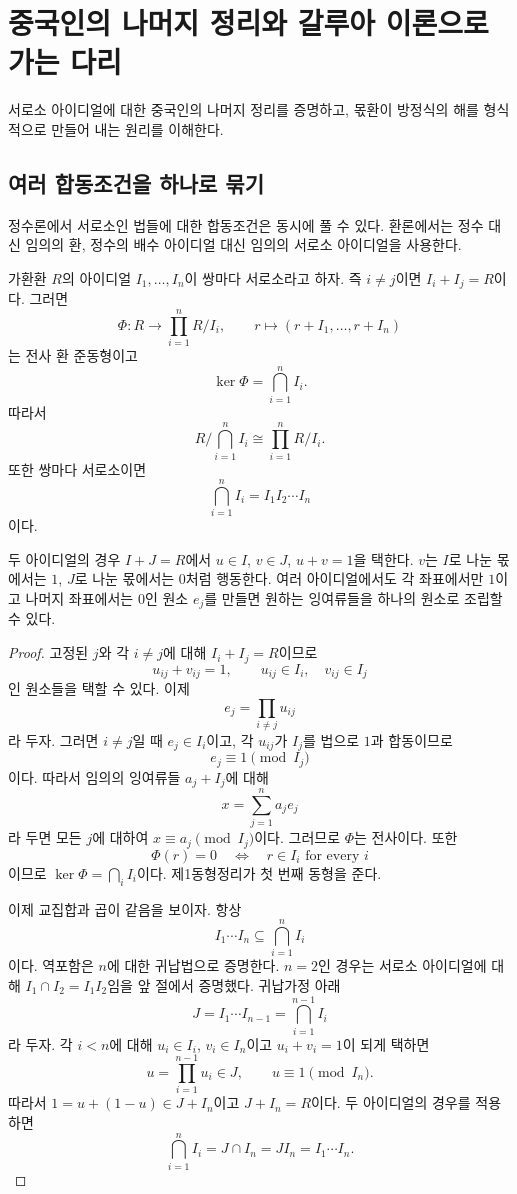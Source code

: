 \section{중국인의 나머지 정리와 갈루아 이론으로 가는 다리}
\label{sec:ring-crt-galois}

\begin{learninggoal}
서로소 아이디얼에 대한 중국인의 나머지 정리를 증명하고, 몫환이 방정식의 해를 형식적으로 만들어 내는 원리를 이해한다.
\end{learninggoal}

\subsection{여러 합동조건을 하나로 묶기}

정수론에서 서로소인 법들에 대한 합동조건은 동시에 풀 수 있다. 환론에서는 정수 대신 임의의 환, 정수의 배수 아이디얼 대신 임의의 서로소 아이디얼을 사용한다.

\begin{theorem}
가환환 $R$의 아이디얼 $I_1,\dots,I_n$이 쌍마다 서로소라고 하자. 즉 $i\ne j$이면 $I_i+I_j=R$이다. 그러면
\[
  \Phi:R\to\prod_{i=1}^nR/I_i,
  \qquad
  r\mapsto(r+I_1,\dots,r+I_n)
\]
는 전사 환 준동형이고
\[
  \ker\Phi=\bigcap_{i=1}^nI_i.
\]
따라서
\[
  R\Big/\bigcap_{i=1}^nI_i
  \cong
  \prod_{i=1}^nR/I_i.
\]
또한 쌍마다 서로소이면
\[
  \bigcap_{i=1}^nI_i=I_1I_2\cdots I_n
\]
이다.
\end{theorem}

\begin{proofidea}
두 아이디얼의 경우 $I+J=R$에서 $u\in I$, $v\in J$, $u+v=1$을 택한다. $v$는 $I$로 나눈 몫에서는 $1$, $J$로 나눈 몫에서는 $0$처럼 행동한다. 여러 아이디얼에서도 각 좌표에서만 $1$이고 나머지 좌표에서는 $0$인 원소 $e_j$를 만들면 원하는 잉여류들을 하나의 원소로 조립할 수 있다.
\end{proofidea}

\begin{proof}
고정된 $j$와 각 $i\ne j$에 대해 $I_i+I_j=R$이므로
\[
  u_{ij}+v_{ij}=1,
  \qquad u_{ij}\in I_i,\quad v_{ij}\in I_j
\]
인 원소들을 택할 수 있다. 이제
\[
  e_j=\prod_{i\ne j}u_{ij}
\]
라 두자. 그러면 $i\ne j$일 때 $e_j\in I_i$이고, 각 $u_{ij}$가 $I_j$를 법으로 $1$과 합동이므로
\[
  e_j\equiv1\pmod{I_j}
\]
이다. 따라서 임의의 잉여류들 $a_j+I_j$에 대해
\[
  x=\sum_{j=1}^na_je_j
\]
라 두면 모든 $j$에 대하여 $x\equiv a_j\pmod{I_j}$이다. 그러므로 $\Phi$는 전사이다. 또한
\[
  \Phi(r)=0
  \quad\Longleftrightarrow\quad
  r\in I_i\text{ for every }i
\]
이므로 $\ker\Phi=\bigcap_iI_i$이다. 제1동형정리가 첫 번째 동형을 준다.

이제 교집합과 곱이 같음을 보이자. 항상
\[
  I_1\cdots I_n\subseteq\bigcap_{i=1}^nI_i
\]
이다. 역포함은 $n$에 대한 귀납법으로 증명한다. $n=2$인 경우는 서로소 아이디얼에 대해 $I_1\cap I_2=I_1I_2$임을 앞 절에서 증명했다. 귀납가정 아래
\[
  J=I_1\cdots I_{n-1}=\bigcap_{i=1}^{n-1}I_i
\]
라 두자. 각 $i<n$에 대해 $u_i\in I_i$, $v_i\in I_n$이고 $u_i+v_i=1$이 되게 택하면
\[
  u=\prod_{i=1}^{n-1}u_i\in J,
  \qquad
  u\equiv1\pmod{I_n}.
\]
따라서 $1=u+(1-u)\in J+I_n$이고 $J+I_n=R$이다. 두 아이디얼의 경우를 적용하면
\[
  \bigcap_{i=1}^nI_i
  =J\cap I_n
  =JI_n
  =I_1\cdots I_n.
\]
\end{proof}

